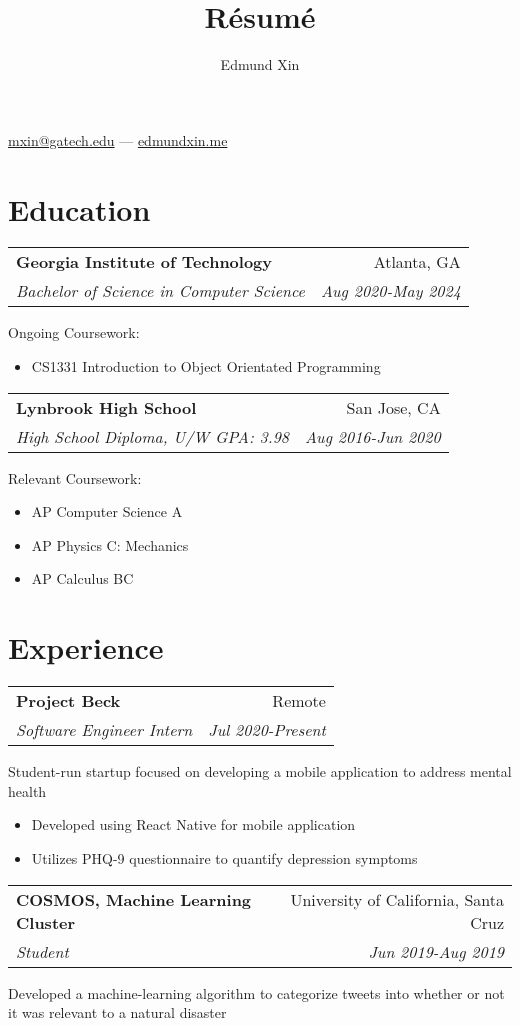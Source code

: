 \documentclass[letterpaper,8pt]{article}
\makeatletter
\renewcommand{\maketitle}{
  \begin{center}
  {\huge\bfseries
  \theauthor}

  \vspace{0.25em}

  \href{mailto:mxin@gatech.edu}{mxin@gatech.edu} --- \href{https://edmundxin.me}{edmundxin.me}

  \end{center}
}
\newcommand{\resumeSubheading}[4]{
  \vspace{0.25em}
  \begin{tabular*}{0.97\textwidth}[t]{l@{\extracolsep{\fill}}r}
    \textbf{#1} & #2 \\
    \textit{#3} & \textit{#4} \\
  \end{tabular*}\vspace{0.25em}
}
\makeatother
\begin{document}
\title{R\'esum\'e}
\author{Edmund Xin}

\maketitle

\section{Education}

\resumeSubheading{Georgia Institute of Technology}
{Atlanta, GA}{Bachelor of Science in Computer Science
}{Aug 2020-May 2024}
Ongoing Coursework:
\begin{itemize}[label=\raisebox{0.25ex}{\tiny$\bullet$}, font=\small]
  \item CS1331 Introduction to Object Orientated Programming
\end{itemize}


\resumeSubheading{Lynbrook High School}
{San Jose, CA}{High School Diploma, U/W GPA: 3.98}{Aug 2016-Jun 2020}
Relevant Coursework:
\begin{itemize}[label=\raisebox{0.25ex}{\tiny$\bullet$}]
  \item AP Computer Science A
  \item AP Physics C: Mechanics
  \item AP Calculus BC
\end{itemize}


\section{Experience}

\resumeSubheading{Project Beck}{Remote}{Software Engineer Intern}{Jul 2020-Present}

Student-run startup focused on developing a mobile application to address mental health

\begin{itemize}[label=\raisebox{0.25ex}{\tiny$\bullet$}]
  \item Developed using React Native for mobile application
  \item Utilizes PHQ-9 questionnaire to quantify depression symptoms
\end{itemize}

\resumeSubheading{COSMOS, Machine Learning Cluster}
{University of California, Santa Cruz}{Student}{Jun 2019-Aug 2019}

Developed a machine-learning algorithm to categorize tweets into whether or not it was relevant to a natural disaster
\end{document}

